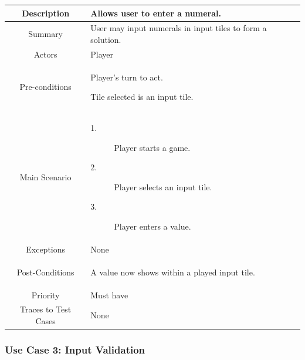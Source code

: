 \documentclass[12pt]{article}
\begin{document}
\begin{table}[htbp]
\begin{center}
\begin{tabular}{| c | m{10cm} |}
\hline
\cellcolor{lightgray}Description & Allows user to enter a numeral.\\
\hline
\cellcolor{lightgray}Summary & User may input numerals in input tiles to form a solution. \\
\hline
\cellcolor{lightgray}Actors & Player \\
\hline
\cellcolor{lightgray}Pre-conditions &
\begin{description}[font=$\bullet$~\normalfont\scshape]
\item Player's turn to act.
\item Tile selected is an input tile. 
\end{description}\\
\hline
\cellcolor{lightgray}Main Scenario & 
\begin{description}
\item [1.]Player starts a game.
\item [2.]Player selects an input tile. 
\item [3.]Player enters a value.
\end{description}\\
\hline
\cellcolor{lightgray}Exceptions & None \\
\hline
\cellcolor{lightgray}Post-Conditions & 
\begin{description}[font=$\bullet$~\normalfont\scshape]
\item A value now shows within a played input tile.
\end{description}\\
\hline
\cellcolor{lightgray}Priority & Must have \\
\hline
\cellcolor{lightgray}Traces to Test Cases & None \\
\hline
\end{tabular}
\end{center}
\end{table}

\newpage
\pagestyle{plain} 
\subsubsection{Use Case 3: Input Validation} \label{uc:1}
\end{document}
